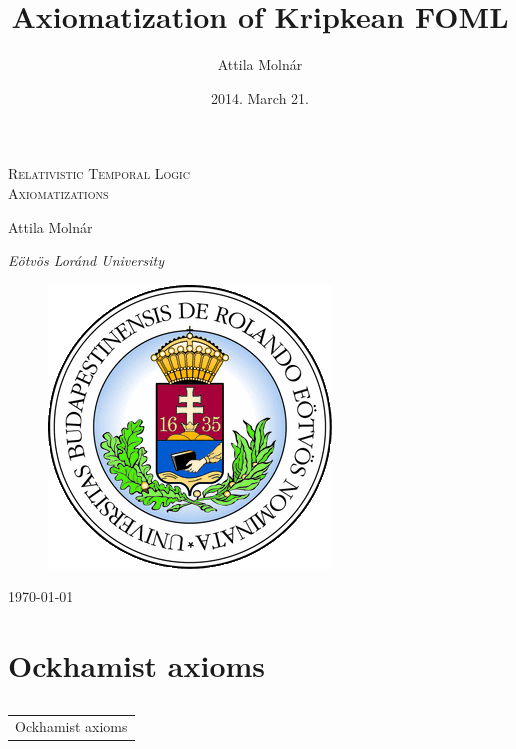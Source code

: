 \documentclass[xcolor=x11names]{beamer}
\author{Attila Moln\'ar}
\date{2014. March 21.}
\title{Axiomatization of Kripkean FOML}
\institute{ELTE}
\makeatletter
\let\beamer@writeslidentry@miniframeson=\beamer@writeslidentry
\def\beamer@writeslidentry@miniframesoff{%
  \expandafter\beamer@ifempty\expandafter{\beamer@framestartpage}{}%
  {%
    \clearpage\beamer@notesactions%
  }
}
\newcommand*{\miniframeson}{\let\beamer@writeslidentry=\beamer@writeslidentry@miniframeson}
\newcommand*{\miniframesoff}{\let\beamer@writeslidentry=\beamer@writeslidentry@miniframesoff}
\newcommand{\cimdia}[1] {\miniframesoff \begin{frame}\begin{center}\huge \begin{tabular}{c}#1\end{tabular}\end{center}\end{frame}\miniframeson}
\newcommand{\szakasz}[2][]{\section{#1}\subsection{}\cimdia{#2}}
\makeatother
\begin{document}
\footnotesize


\begin{frame}
\centering
\textsc{\Large Relativistic Temporal Logic \\[1em] Axiomatizations}

\bigskip

{ \small Attila Moln\'ar

    \textit{E\"otv\"os Lor\'and University}}

 \begin{figure}
\includegraphics[scale=.3]{elte_cimer.png}
 \end{figure}

	\today
\end{frame}


\szakasz[Ockhamist axioms]{Ockhamist axioms}
\end{document}
